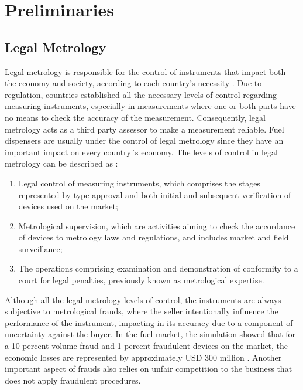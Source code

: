 \documentclass[sigplan]{acmart}
\begin{document}
\section{Preliminaries}

\subsection{Legal Metrology}

Legal metrology is responsible for the control of instruments that impact both the economy and society, according to each country's necessity \cite{RodriguesFilho2015}.
Due to regulation, countries established all the necessary levels of control regarding measuring instruments, especially in measurements where one or both parts have no means to check the accuracy of the measurement. 
Consequently, legal metrology acts as a third party assessor to make a measurement reliable.
Fuel dispensers are usually under the control of legal metrology since they have an important impact on every country´s economy. The levels of control in legal metrology can be described as \cite{VIM2012}:

\begin{enumerate}
 \item Legal control of measuring instruments, which comprises the stages represented by type approval and both initial and subsequent verification of devices used on the market;
 \item Metrological supervision, which are activities aiming to check the accordance of devices to metrology laws and regulations, and includes market and field surveillance;
 \item The operations comprising examination and demonstration of conformity to a court for legal penalties, previously known as metrological expertise.
\end{enumerate}

Although all the legal metrology levels of control, the instruments are always subjective to metrological frauds, where the seller intentionally influence the performance of the instrument,  impacting in its accuracy due to a component of uncertainty against the buyer. 
In the fuel market, the simulation showed that for a 10 percent volume fraud and 1 percent fraudulent devices on the market, the economic losses are represented by approximately USD 300 million \citep{RodriguesFilho2016}. 
Another important aspect of frauds also relies on unfair competition to the business that does not apply fraudulent procedures.
\end{document}
